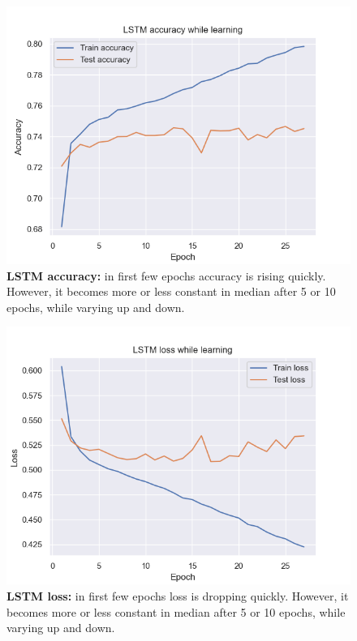 \documentclass[conference]{IEEEtran}
\begin{document}
\begin{figure}[hbt!]\centering
\centering
\includegraphics[width=\linewidth]{lstm-accuracy-27}
\caption{\textbf{LSTM accuracy:} in first few epochs accuracy is rising quickly. However, it becomes more or less constant in median after 5 or 10 epochs, while varying up and down.}
\label{pic4}
\end{figure}

\begin{figure}[hbt!]\centering
\centering
\includegraphics[width=\linewidth]{lstm-loss-27}
\caption{\textbf{LSTM loss:} in first few epochs loss is dropping quickly. However, it becomes more or less constant in median after 5 or 10 epochs, while varying up and down.}
\label{pic5}
\end{figure}
\end{document}
